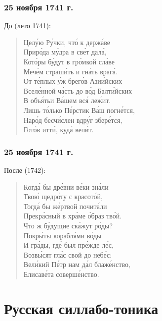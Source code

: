 \documentclass{beamer}
\begin{document}


\begin{frame}
\frametitle{25 ноября 1741 г.}
До (лето 1741):

\begin{verse}
Цел\'{у}ю Р\'{у}чки, чт\'{о} к держ\'{а}ве\\
Прир\'{о}да м\'{у}дра в св\'{е}т дал\'{а},\\
Кот\'{о}ры б\'{у}дут в гр\'{о}мкой сл\'{а}ве\\
Меч\'{е}м страш\'{и}ть и гн\'{а}ть враг\'{а}.\\
От т\'{е}плых \'{у}ж брег\'{о}в Ази\'{и}йских\\
Всел\'{е}нной ч\'{а}сть до в\'{о}д Балт\'{и}йских\\
В объ\'{я}тьи В\'{а}шем вс\'{я} ле\'{ж}ит.\\
Лишь т\'{о}лько П\'{е}рстик В\'{а}ш погн\'{е}тся,\\
Нар\'{о}д бесч\'{и}слен вдр\'{у}г збер\'{е}тся,\\
Гот\'{о}в итт\'{и}, куд\'{а} вел\'{и}т.
\end{verse}
\end{frame}

\begin{frame}
\frametitle{25 ноября 1741 г.}
После (1742):

\begin{verse}
Когд\'{а} бы др\'{е}вни в\'{е}ки зн\'{а}ли\\
Тво\'{ю} щедр\'{о}ту с кр\alert{а}сот\'{о}й,\\
Тогд\'{а} бы ж\'{е}ртвой п\alert{о}чит\'{а}ли\\
Прекр\'{а}сный в хр\'{а}ме \'{о}браз тв\'{о}й.\\
Что ж б\'{у}дущ\alert{и}е ск\'{а}жут р\'{о}ды?\\
Покр\'{ы}ты к\alert{о}рабл\'{я}ми в\'{о}ды\\
И гр\'{а}ды, гд\'{е} был пр\'{е}жде л\'{е}с,\\
Возв\'{ы}сят гл\'{а}с свой д\alert{о} неб\'{е}с:\\
Вел\'{и}кий П\'{е}тр нам д\'{а}л блаж\'{е}нство,\\
Ел\alert{и}сав\'{е}та с\alert{о}верш\'{е}нство.
\end{verse}
\end{frame}


\section{Русская силлабо-тоника}\label{sec:rusyl}
\end{document}
